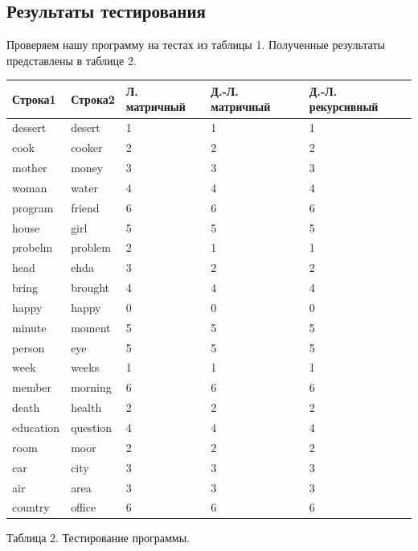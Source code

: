 \documentclass[a4paper,14pt]{article} %
\begin{document}
        \subsection{Результаты тестирования}
        
	\hfill
	
	Проверяем нашу программу на тестах из таблицы 1. Полученные результаты представлены в таблице 2. 
	
	\begin{center}
       		\begin{tabular}{ | l | l | l | l | l |}
			\hline
			\textbf{Строка1} & \textbf{Строка2} & \textbf{Л. матричный} & \textbf{Д.-Л. матричный}  & \textbf{Д.-Л. рекурсивный}\\ \hline
			dessert  &  desert  &  1  &  1  &  1 \\ \hline
			cook  &  cooker  &  2  &  2  &  2 \\ \hline
			mother  &  money  &  3  &  3  &  3 \\ \hline
			woman  &  water  &  4  &  4  &  4 \\ \hline
			program  &  friend  &  6  &  6  &  6 \\ \hline
			house  &  girl  &  5  &  5  &  5 \\ \hline
			probelm  &  problem  &  2  &  1  &  1 \\ \hline
			head  &  ehda  &  3  &  2  &  2 \\ \hline
			bring  &  brought  &  4  &  4  &  4 \\ \hline
			happy  &  happy  &  0  &  0  &  0 \\ \hline
			minute  &  moment  &  5  &  5  &  5 \\ \hline
			person  &  eye  &  5  &  5  &  5 \\ \hline
			week  &  weeks  &  1  &  1  &  1 \\ \hline
			member  &  morning  &  6  &  6  &  6 \\ \hline
			death  &  health  &  2  &  2  &  2 \\ \hline
			education  &  question  &  4  &  4  &  4 \\ \hline
			room  &  moor  &  2  &  2  &  2 \\ \hline
			car  &  city  &  3  &  3  &  3 \\ \hline
			air  &  area  &  3  &  3  &  3 \\ \hline
			country  &  office  &  6  &  6  &  6 \\ \hline
		\end{tabular}
		
		\hfill
		
		Таблица 2.
		Тестирование программы.  
	\end{center}
	
\end{document}

